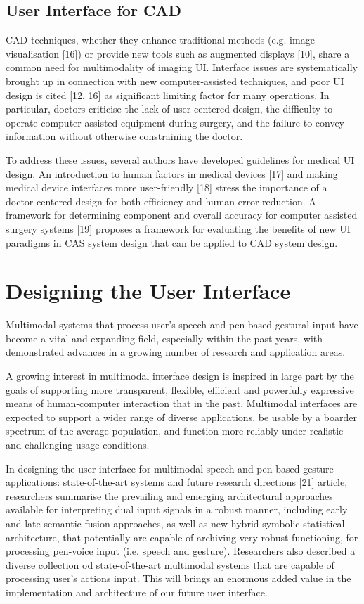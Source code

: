 \subsection{User Interface for CAD}

CAD techniques, whether they enhance traditional methods (e.g. image visualisation [16]) or provide new tools such as augmented displays [10], share a common need for multimodality of imaging UI. Interface issues are systematically brought up in connection with new computer-assisted techniques, and poor UI design is cited [12, 16] as significant limiting factor for many operations. In particular, doctors criticise the lack of user-centered design, the difficulty to operate computer-assisted equipment during surgery, and the failure to convey information without otherwise constraining the doctor.

To address these issues, several authors have developed guidelines for medical UI design. An introduction to human factors in medical devices [17] and making medical device interfaces more user-friendly [18] stress the importance of a doctor-centered design for both efficiency and human error reduction. A framework for determining component and overall accuracy for computer assisted surgery systems [19] proposes a framework for evaluating the benefits of new UI paradigms in CAS system design that can be applied to CAD system design.

\section{Designing the User Interface}

Multimodal systems that process user's speech and pen-based gestural input have become a vital and expanding field, especially within the past years, with demonstrated advances in a growing number of research and application areas.

A growing interest in multimodal interface design is inspired in large part by the goals of supporting more transparent, flexible, efficient and powerfully expressive means of human-computer interaction that in the past. Multimodal interfaces are expected to support a wider range of diverse applications, be usable by a boarder spectrum of the average population, and function more reliably under realistic and challenging usage conditions.

In designing the user interface for multimodal speech and pen-based gesture applications: state-of-the-art systems and future research directions [21] article, researchers summarise the prevailing and emerging architectural approaches available for interpreting dual input signals in a robust manner, including early and late semantic fusion approaches, as well as new hybrid symbolic-statistical architecture, that potentially are capable of archiving very robust functioning, for processing pen-voice input (i.e. speech and gesture). Researchers also described a diverse collection od state-of-the-art multimodal systems that are capable of processing user's actions input. This will brings an enormous added value in the implementation and architecture of our future user interface.

